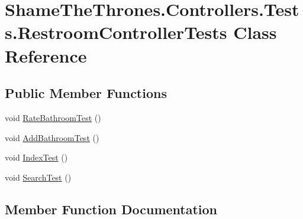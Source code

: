\hypertarget{class_shame_the_thrones_1_1_controllers_1_1_tests_1_1_restroom_controller_tests}{}\section{Shame\+The\+Thrones.\+Controllers.\+Tests.\+Restroom\+Controller\+Tests Class Reference}
\label{class_shame_the_thrones_1_1_controllers_1_1_tests_1_1_restroom_controller_tests}
\subsection*{Public Member Functions}
\begin{DoxyCompactItemize}
\item 
void \hyperlink{class_shame_the_thrones_1_1_controllers_1_1_tests_1_1_restroom_controller_tests_ae9c7cb17281cb5a3687dcec4fe2efc02}{Rate\+Bathroom\+Test} ()
\item 
void \hyperlink{class_shame_the_thrones_1_1_controllers_1_1_tests_1_1_restroom_controller_tests_acabd938ea0fdf0139fbd5f321b61181a}{Add\+Bathroom\+Test} ()
\item 
void \hyperlink{class_shame_the_thrones_1_1_controllers_1_1_tests_1_1_restroom_controller_tests_add2302ceffd4cced114d85d51d617d04}{Index\+Test} ()
\item 
void \hyperlink{class_shame_the_thrones_1_1_controllers_1_1_tests_1_1_restroom_controller_tests_aa017fe178aec96b55bcd0c717d800aaf}{Search\+Test} ()
\end{DoxyCompactItemize}


\subsection{Member Function Documentation}
